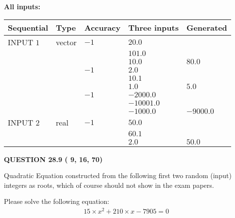 \documentclass[12pt]{article}
\begin{document}
   
   
   
\noindent\vspace{0.1in}\hspace{-0.08in} {\textbf{\Large{All inputs: }}}
   
   
  
  
\noindent\begin{tabular}{|l|l|l|l|l|}
\hline
 Sequential & Type & Accuracy & Three inputs & Generated \\ 
\hline
 
 
  INPUT $           1$ & vector & $          -1 $ & $
20.0
  $ & \\
  & & & $
101.0
  $ & \\
  & & & $
10.0
$ & $ 80.0 $ 
  \\
  & & $          -1 $ & $
2.0
  $ & \\
  & & & $
10.1
  $ & \\
  & & & $
1.0
$ & $ 5.0 $ 
  \\
  & & $          -1 $ & $
-2000.0
  $ & \\
  & & & $
-10001.0
  $ & \\
  & & & $
-1000.0
$ & $ -9000.0 $ 
 \\  \hline  
 
 
  INPUT $           2$ & real & $          -1 $ & $
 50.0
  $ & \\
  & & &  $
 60.1
  $ & \\
  & & &  $
 2.0
 $ & $ 50.0 $ 
 \\  \hline  
 \end{tabular}
   
   
  
\vspace{0.2in}
  
{\textbf{\Large{QUESTION
28.9 
 (          9,         16,         70)
}}}
  
  


\noindent{}
Quadratic Equation constructed from the following first two random (input) integers as roots,  
which of course should not show in the exam papers.  
\noindent{}


 
 

 
Please solve the following equation:
\begin{eqnarray*}
15 \times x^2  %
+  %
210
                 \times x    %
-7905 =0
\end{eqnarray*}
 
\end{document}
